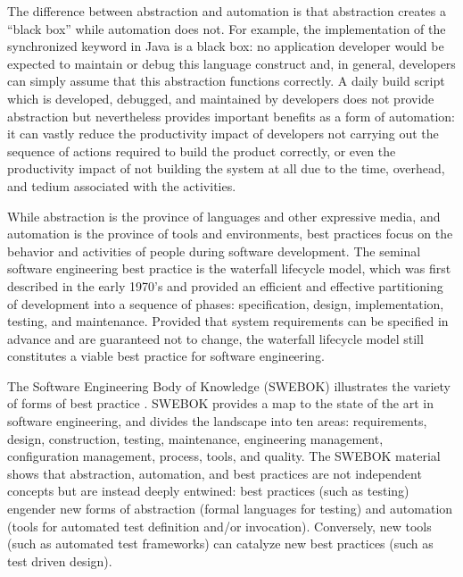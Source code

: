 The difference between abstraction and automation is that abstraction
creates a ``black box'' while automation does not. For example, the
implementation of the synchronized keyword in Java is a black box: no
application developer would be expected to maintain or debug this language
construct and, in general, developers can simply assume that this
abstraction functions correctly.  A daily build script which is developed,
debugged, and maintained by developers does not provide abstraction but
nevertheless provides important benefits as a form of automation: it can
vastly reduce the productivity impact of developers not carrying out the
sequence of actions required to build the product correctly, or even the
productivity impact of not building the system at all due to the time,
overhead, and tedium associated with the activities.

While abstraction is the province of languages and other expressive media,
and automation is the province of tools and environments, best practices
focus on the behavior and activities of people during software development.
The seminal software engineering best practice is the waterfall lifecycle
model, which was first described in the early 1970's and provided an
efficient and effective partitioning of development into a sequence of
phases: specification, design, implementation, testing, and maintenance.
Provided that system requirements can be specified in advance and are
guaranteed not to change, the waterfall lifecycle model still constitutes a
viable best practice for software engineering.

The Software Engineering Body of Knowledge (SWEBOK) illustrates the variety
of forms of best practice \cite{Abran05}.  SWEBOK provides a map to the
state of the art in software engineering, and divides the landscape into
ten areas: requirements, design, construction, testing, maintenance,
engineering management, configuration management, process, tools, and
quality.  The SWEBOK material shows that abstraction, automation, and best
practices are not independent concepts but are instead deeply entwined:
best practices (such as testing) engender new forms of abstraction (formal
languages for testing) and automation (tools for automated test definition
and/or invocation). Conversely, new tools (such as automated test
frameworks) can catalyze new best practices (such as test driven design).


